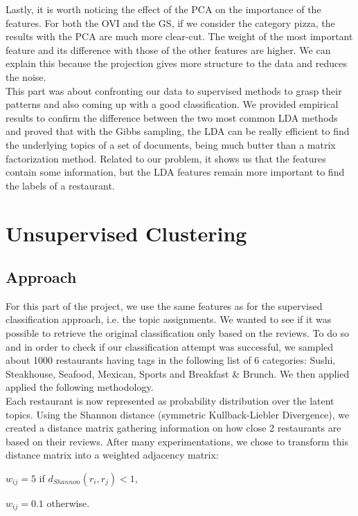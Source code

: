 \documentclass[twoside]{article}
\begin{document}
\begin{multicols}{2}
Lastly, it is worth noticing the effect of the PCA on the importance of the features. For both the OVI and the GS, if we consider the category pizza, the results with the PCA are much more clear-cut. The weight of the most important feature and its difference with those of the other features are higher. We can explain this because the projection gives more structure to the data and reduces the noise.\\

This part was about confronting our data to supervised methods to grasp their patterns and also coming up with a good classification. We provided empirical results to confirm the difference between the two most common LDA methods and proved that with the Gibbs sampling, the LDA can be really efficient to find the underlying topics of a set of documents, being much butter than a matrix factorization method. Related to our problem, it shows us that the features contain some information, but the LDA features remain more important to find the labels of a restaurant.

\section{Unsupervised Clustering}
\subsection{Approach}

For this part of the project, we use the same features as for the supervised classification approach, i.e. the topic assignments. We wanted to see if it was possible to retrieve the original classification only based on the reviews. To do so and in order to check if our classification attempt was successful, we sampled about 1000 restaurants having tags in the following list of 6 categories: Sushi, Steakhouse, Seafood, Mexican, Sports and Breakfast \& Brunch. We then applied applied the following methodology.\\

Each restaurant is now represented as probability distribution over the latent topics. Using the Shannon distance (symmetric Kullback-Liebler Divergence), we created a distance matrix gathering information on how close 2 restaurants are based on their reviews. After many experimentations, we chose to transform this distance matrix into a weighted adjacency matrix:\\

\begin{compactitem}
\item $w_{ij} = 5$ if $d_{Shannon}(r_i,r_j)<1$,
\item $w_{ij} = 0.1$ otherwise.\\
\end{compactitem}


\end{multicols}
\end{document}

